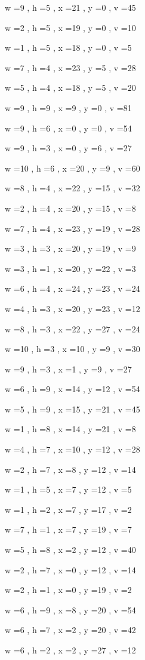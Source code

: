 \documentclass[11pt]{article}
\begin{document}
w =9 , h =5 , x =21 , y =0 , v =45
\par
w =2 , h =5 , x =19 , y =0 , v =10
\par
w =1 , h =5 , x =18 , y =0 , v =5
\par
w =7 , h =4 , x =23 , y =5 , v =28
\par
w =5 , h =4 , x =18 , y =5 , v =20
\par
w =9 , h =9 , x =9 , y =0 , v =81
\par
w =9 , h =6 , x =0 , y =0 , v =54
\par
w =9 , h =3 , x =0 , y =6 , v =27
\par
w =10 , h =6 , x =20 , y =9 , v =60
\par
w =8 , h =4 , x =22 , y =15 , v =32
\par
w =2 , h =4 , x =20 , y =15 , v =8
\par
w =7 , h =4 , x =23 , y =19 , v =28
\par
w =3 , h =3 , x =20 , y =19 , v =9
\par
w =3 , h =1 , x =20 , y =22 , v =3
\par
w =6 , h =4 , x =24 , y =23 , v =24
\par
w =4 , h =3 , x =20 , y =23 , v =12
\par
w =8 , h =3 , x =22 , y =27 , v =24
\par
w =10 , h =3 , x =10 , y =9 , v =30
\par
w =9 , h =3 , x =1 , y =9 , v =27
\par
w =6 , h =9 , x =14 , y =12 , v =54
\par
w =5 , h =9 , x =15 , y =21 , v =45
\par
w =1 , h =8 , x =14 , y =21 , v =8
\par
w =4 , h =7 , x =10 , y =12 , v =28
\par
w =2 , h =7 , x =8 , y =12 , v =14
\par
w =1 , h =5 , x =7 , y =12 , v =5
\par
w =1 , h =2 , x =7 , y =17 , v =2
\par
w =7 , h =1 , x =7 , y =19 , v =7
\par
w =5 , h =8 , x =2 , y =12 , v =40
\par
w =2 , h =7 , x =0 , y =12 , v =14
\par
w =2 , h =1 , x =0 , y =19 , v =2
\par
w =6 , h =9 , x =8 , y =20 , v =54
\par
w =6 , h =7 , x =2 , y =20 , v =42
\par
w =6 , h =2 , x =2 , y =27 , v =12
\par
\newpage
\end{document}
